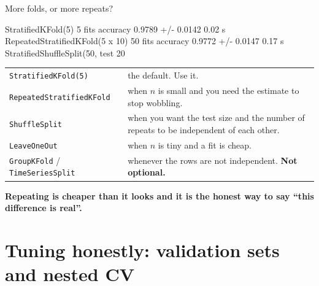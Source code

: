 \documentclass[aspectratio=169]{beamer}
\begin{document}
\begin{frame}[fragile,shrink=8]{More folds, or more repeats?}
\begin{outblk}
   StratifiedKFold(5)                    5 fits  accuracy 0.9789 +/- 0.0142   0.02 s
   RepeatedStratifiedKFold(5 x 10)      50 fits  accuracy 0.9772 +/- 0.0147   0.17 s
   StratifiedShuffleSplit(50, test 20%
\end{outblk}
\begin{center}\small
  \begin{tabular}{@{}lp{7.6cm}@{}}
    \toprule
    \texttt{StratifiedKFold(5)} & the default. Use it.\\
    \texttt{RepeatedStratifiedKFold} & when $n$ is small and you need the
      estimate to stop wobbling.\\
    \texttt{ShuffleSplit} & when you want the test size and the number of
      repeats to be independent of each other.\\
    \texttt{LeaveOneOut} & when $n$ is tiny and a fit is cheap.\\
    \texttt{GroupKFold} / \texttt{TimeSeriesSplit} & whenever the rows are not
      independent. \textbf{Not optional.}\\
    \bottomrule
  \end{tabular}
\end{center}
\begin{center}\small
  \textbf{Repeating is cheaper than it looks and it is the honest way to say
  ``this difference is real''.}
\end{center}
\end{frame}

\section[Tuning]{Tuning honestly: validation sets and nested CV}
\label{sec:nested}
\end{document}
